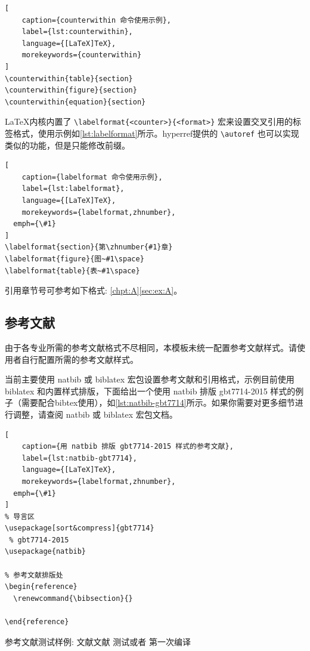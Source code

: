 \documentclass{nktba}
\begin{document}
\begin{lstlisting}[
	caption={counterwithin 命令使用示例},
	label={lst:counterwithin},
	language={[LaTeX]TeX},
	morekeywords={counterwithin}
]
\counterwithin{table}{section}
\counterwithin{figure}{section}
\counterwithin{equation}{section}
\end{lstlisting}

\LaTeX 内核内置了 \verb|\labelformat{<counter>}{<format>}| 宏来设置交叉引用的标签格式，使用示例如\ref{lst:labelformat}所示。hyperref提供的 \verb|\autoref| 也可以实现类似的功能，但是只能修改前缀。

\begin{lstlisting}[
	caption={labelformat 命令使用示例},
	label={lst:labelformat},
	language={[LaTeX]TeX},
	morekeywords={labelformat,zhnumber},
  emph={\#1}
]
\labelformat{section}{第\zhnumber{#1}章}
\labelformat{figure}{图~#1\space}
\labelformat{table}{表~#1\space}
\end{lstlisting}

引用章节号可参考如下格式: \ref{chpt:A}\ref{sec:ex:A}。

\subsection{参考文献} \label{manual:ref}

由于各专业所需的参考文献格式不尽相同，本模板未统一配置参考文献样式。请使用者自行配置所需的参考文献样式。

当前主要使用 natbib 或 biblatex 宏包设置参考文献和引用格式，示例目前使用 biblatex 和内置样式排版，下面给出一个使用 natbib 排版 gbt7714-2015 样式的例子（需要配合bibtex使用），如\ref{lst:natbib-gbt7714}所示。如果你需要对更多细节进行调整，请查阅 natbib 或 biblatex 宏包文档。

\begin{lstlisting}[
	caption={用 natbib 排版 gbt7714-2015 样式的参考文献},
	label={lst:natbib-gbt7714},
	language={[LaTeX]TeX},
	morekeywords={labelformat,zhnumber},
  emph={\#1}
]
% 导言区
\usepackage[sort&compress]{gbt7714}
 % gbt7714-2015
\usepackage{natbib}

% 参考文献排版处
\begin{reference}
  \renewcommand{\bibsection}{}
  
\end{reference}
\end{lstlisting}

参考文献测试样例:
\cite{ChenCheChen2001,Nadkarni-1992,Hua-Wang-1973}
文献\cite{ZhuKeZhen,Huo}文献\cite{JiangXiZhou,Timoshenko,Zhang-Wang}
\cite{ZhuKeZhen}
测试\citep{PQEMU}或者\citep{li1988ivy}
第一次编译\cite{hong2012hqemu}\cite{zaharia2010spark}\cite{wenwenasplos2018}
\end{document}
